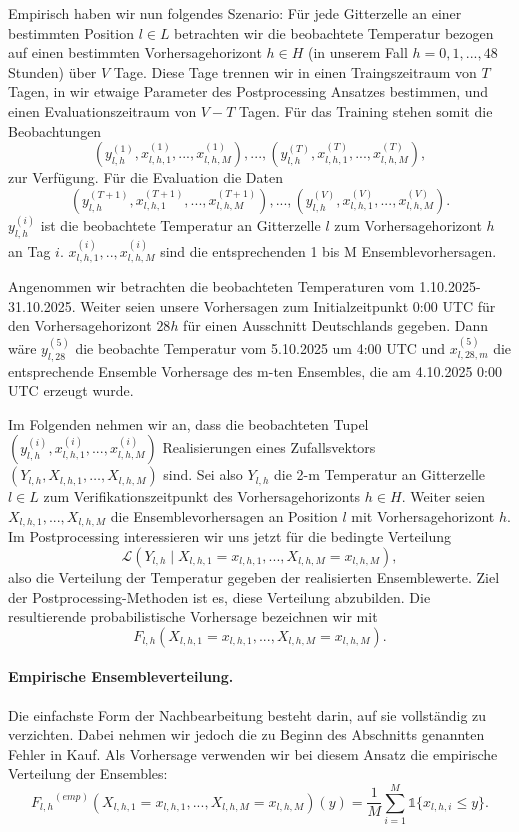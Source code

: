 \documentclass{article}
\numberwithin{equation}{section}
\begin{document}
Empirisch haben wir nun folgendes Szenario: Für jede Gitterzelle an einer bestimmten Position $l \in L$ betrachten wir die beobachtete Temperatur bezogen auf einen bestimmten Vorhersagehorizont $h \in H$ (in unserem Fall $h=0,1,...,48$ Stunden) über $V$ Tage. Diese Tage trennen wir in einen Traingszeitraum von $T$ Tagen, in wir etwaige Parameter des Postprocessing Ansatzes bestimmen, und einen Evaluationszeitraum von $V-T$ Tagen. Für das Training stehen somit die Beobachtungen
\[
(y_{l,h}^{(1)}, x_{l,h,1}^{(1)},...,x_{l,h,M}^{(1)}), ..., (y_{l,h}^{(T)}, x_{l,h,1}^{(T)},...,x_{l,h,M}^{(T)}),
\]
zur Verfügung. Für die Evaluation die Daten
\[
(y_{l,h}^{(T+1)}, x_{l,h,1}^{(T+1)},...,x_{l,h,M}^{(T+1)}), ..., (y_{l,h}^{(V)}, x_{l,h,1}^{(V)},...,x_{l,h,M}^{(V)}).
\]
$y_{l,h}^{(i)}$ ist die beobachtete Temperatur an Gitterzelle $l$ zum Vorhersagehorizont $h$ an Tag $i$.  $x_{l,h,1}^{(i)},..,x_{l,h,M}^{(i)}$ sind die entsprechenden 1 bis M Ensemblevorhersagen.

Angenommen wir betrachten die beobachteten Temperaturen vom 1.10.2025-31.10.2025. Weiter seien unsere Vorhersagen zum Initialzeitpunkt 0:00 UTC für den Vorhersagehorizont $28h$ für einen Ausschnitt Deutschlands gegeben. Dann wäre $y_{l,28}^{(5)}$ die beobachte Temperatur vom 5.10.2025 um 4:00 UTC und $x_{l,28,m}^{(5)}$ die entsprechende Ensemble Vorhersage des m-ten Ensembles, die am 4.10.2025 0:00 UTC erzeugt wurde. 

Im Folgenden nehmen wir an, dass die beobachteten Tupel $(y_{l,h}^{(i)}, x_{l,h,1}^{(i)},...,x_{l,h,M}^{(i)})$ Realisierungen eines Zufallsvektors $(Y_{l,h},X_{l,h,1},…,X_{l,h,M})$ sind. Sei also $Y_{l,h}$ die 2-m Temperatur an Gitterzelle $l \in L$ zum Verifikationszeitpunkt des Vorhersagehorizonts $h \in H$. Weiter seien $X_{l,h,1},...,X_{l,h,M}$ die Ensemblevorhersagen an Position $l$ mit Vorhersagehorizont $h$. Im Postprocessing interessieren wir uns jetzt für die bedingte Verteilung
\[
\mathcal{L}(Y_{l,h} \mid X_{l,h,1}=x_{l,h,1},...,X_{l,h,M}=x_{l,h,M}),
\]
also die Verteilung der Temperatur gegeben der realisierten Ensemblewerte. Ziel der Postprocessing-Methoden ist es, diese Verteilung abzubilden. Die resultierende probabilistische Vorhersage bezeichnen wir mit
\[
F_{l,h}(X_{l,h,1}=x_{l,h,1},...,X_{l,h,M}=x_{l,h,M}).
\]

\paragraph{Empirische Ensembleverteilung.}
Die einfachste Form der Nachbearbeitung besteht darin, auf sie vollständig zu verzichten. Dabei nehmen wir jedoch die zu Beginn des Abschnitts genannten Fehler in Kauf. Als Vorhersage verwenden wir bei diesem Ansatz die empirische Verteilung der Ensembles:
\[
{F_{l,h}}^{(emp)}(X_{l,h,1}=x_{l,h,1},...,X_{l,h,M}=x_{l,h,M})(y)= \frac{1}{M} \sum_{i=1}^{M} \mathds{1}\{x_{l,h,i} \leq y\}.
\]
\end{document}
